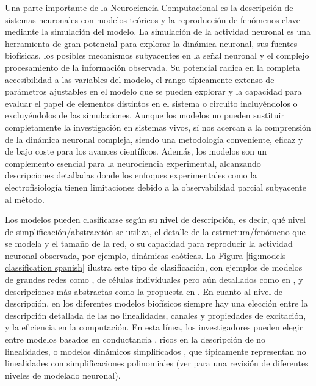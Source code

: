 Una parte importante de la Neurociencia Computacional es la descripción de sistemas neuronales con modelos teóricos y la reproducción de fenómenos clave mediante la simulación del modelo. La simulación de la actividad neuronal es una herramienta de gran potencial para explorar la dinámica neuronal, sus fuentes biofísicas, los posibles mecanismos subyacentes en la señal neuronal y el complejo procesamiento de la información observada. Su potencial radica en la completa accesibilidad a las variables del modelo, el rango típicamente extenso de parámetros ajustables en el modelo que se pueden explorar y la capacidad para evaluar el papel de elementos distintos en el sistema o circuito incluyéndolos o excluyéndolos de las simulaciones. Aunque los modelos no pueden sustituir completamente la investigación en sistemas vivos, sí nos acercan a la comprensión de la dinámica neuronal compleja, siendo una metodología conveniente, eficaz y de bajo coste para los avances científicos. Además, los modelos son un complemento esencial para la neurociencia experimental, alcanzando descripciones detalladas donde los enfoques experimentales como la electrofisiología tienen limitaciones debido a la observabilidad parcial subyacente al método.

Los modelos pueden clasificarse según su nivel de descripción, es decir, qué nivel de simplificación/abstracción se utiliza, el detalle de la estructura/fenómeno que se modela y el tamaño de la red, o su capacidad para reproducir la actividad neuronal observada, por ejemplo, dinámicas caóticas. La Figura \ref{fig:models-classification spanish} ilustra este tipo de clasificación, con ejemplos de modelos de grandes redes como \textcite{potjans_celltype_2014,bezaire_interneuronal_2016}, de células individuales pero aún detallados como en \textcite{smith_dendritic_2013}, y descripciones más abstractas como la propuesta en \textcite{izhikevich_simple_2003}. En cuanto al nivel de descripción, en los diferentes modelos biofísicos siempre hay una elección entre la descripción detallada de las no linealidades, canales y propiedades de excitación, y la eficiencia en la computación. En esta línea, los investigadores pueden elegir entre modelos basados en conductancia \parencite{hodgkin_quantitative_1952}, ricos en la descripción de no linealidades, o modelos dinámicos simplificados \parencite{hindmarsh_model_1984,fitzhugh_impulses_1961}, que típicamente representan no linealidades con simplificaciones polinomiales (ver \textcite{torres_modeling_2012} para una revisión de diferentes niveles de modelado neuronal).

